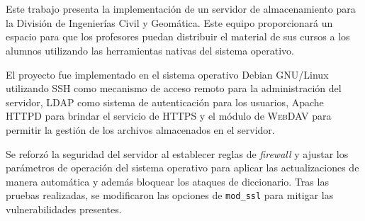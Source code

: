 \cleardoublepage  
\chapter*{\abstractname}
\label{chap:abstract}

Este trabajo presenta la implementaci\'{o}n de un servidor de almacenamiento para la Divisi\'{o}n de Ingenier\'{i}as Civil y Geom\'{a}tica. Este equipo proporcionar\'{a} un espacio para que los profesores puedan distribuir el material de sus cursos a los alumnos utilizando las herramientas nativas del sistema operativo.

\vspace{2.5em}

El proyecto fue implementado en el sistema operativo Debian \textsc{GNU}/Linux utilizando \textsc{SSH} como mecanismo de acceso remoto para la administraci\'{o}n del servidor, \textsc{LDAP} como sistema de autenticaci\'{o}n para los usuarios, Apache \textsc{HTTPD} para brindar el servicio de \textsc{HTTPS} y el m\'{o}dulo de \textsc{WebDAV} para permitir la gesti\'{o}n de los archivos almacenados en el servidor.

\vspace{2.5em}

Se reforz\'{o} la seguridad del servidor al establecer reglas de \emph{firewall} y ajustar los par\'{a}metros de operaci\'{o}n del sistema operativo para aplicar las actualizaciones de manera autom\'{a}tica y adem\'{a}s bloquear los ataques de diccionario. Tras las pruebas realizadas, se modificaron las opciones de \texttt{mod\_ssl} para mitigar las vulnerabilidades presentes.

